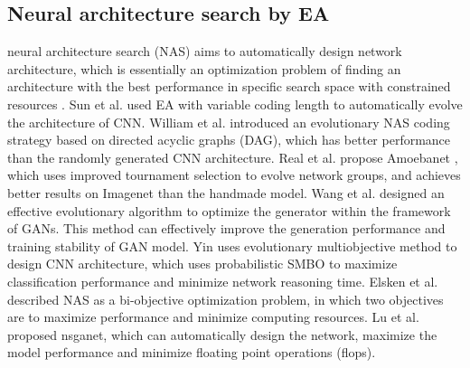 \documentclass[lettersize,journal]{IEEEtran}
\begin{document}
\subsection{Neural architecture search by EA}
neural architecture search (NAS) aims to automatically design network architecture, which is essentially an optimization problem of ﬁnding an architecture with the best performance in speciﬁc search space with constrained resources \cite{50, 51}. Sun et al. \cite{52} used EA with variable coding length to automatically evolve the architecture of CNN. William et al. \cite{53} introduced an evolutionary NAS coding strategy based on directed acyclic graphs (DAG), which has better performance than the randomly generated CNN architecture. Real et al. propose Amoebanet \cite{54}, which uses improved tournament selection to evolve network groups, and achieves better results on Imagenet than the handmade model. Wang et al. \cite{55} designed an effective evolutionary algorithm to optimize the generator within the framework of GANs. This method can effectively improve the generation performance and training stability of GAN model. Yin \cite{56} uses evolutionary multiobjective method to design CNN architecture, which uses probabilistic SMBO to maximize classification performance and minimize network reasoning time. Elsken et al. \cite{57} described NAS as a bi-objective optimization problem, in which two objectives are to maximize performance and minimize computing resources. Lu et al. \cite{58} proposed nsganet, which can automatically design the network, maximize the model performance and minimize floating point operations (flops). 
\end{document}
